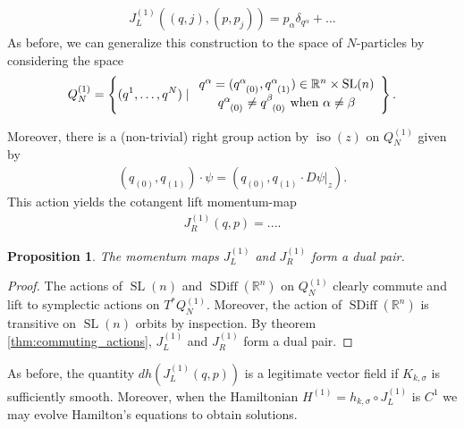 \documentclass[12pt]{amsart}
\newcommand{\R}{\ensuremath{\mathbb{R}}}
\newtheorem{prop}[thm]{Proposition}
\DeclareMathOperator{\SDiff}{SDiff}
\DeclareMathOperator{\SL}{SL}
\DeclareMathOperator{\iso}{iso}
\begin{document}
  \begin{align*}
    J_L^{(1)}( (q, j ),(p, p_j) ) = p_\alpha \delta_{q^{\alpha}} + \dots
  \end{align*}
  As before, we can generalize this construction to the space of
  $N$-particles by considering the space
  \begin{align*}
    Q^{(1)}_N = \left\{  ( q^1 , \dots, q^N ) \mid 
      \begin{array}{c}
        q^\alpha = (q\indices{^\alpha_{(0)} } ,q\indices{^\alpha_{(1)} } ) \in \R^n \times \SL(n) \\
        q\indices{^\alpha_{(0)}} \neq q\indices{^\beta_{(0)}} \text{ when } \alpha \neq \beta
      \end{array} \right\}. 
  \end{align*}

  Moreover, there is a (non-trivial) right group action by $\iso(z)$ on $Q^{(1)}_N$ given by
  \begin{align*}
    (q_{(0)} , q_{(1)} ) \cdot \psi = (q_{(0)} , q_{(1)} \cdot D\psi|_z).
  \end{align*}
  This action yields the cotangent lift momentum-map
  \begin{align*}
    J_R^{(1)}( q,p) = ....
  \end{align*}
  \begin{prop}
    The momentum maps $J_L^{(1)}$ and $J_R^{(1)}$ form a dual pair.
  \end{prop}
  \begin{proof}
    The actions of $\SL(n)$ and $\SDiff(\R^n)$ on $Q_N^{(1)}$ clearly commute
    and lift to symplectic actions on $T^*Q_N^{(1)}$.
    Moreover, the action of $\SDiff(\R^n)$ is transitive on $\SL(n)$ orbits
    by inspection.
    By theorem \ref{thm:commuting_actions}, $J_L^{(1)}$ and $J_R^{(1)}$ form a dual pair.
  \end{proof}

  As before, the quantity $dh( J_L^{(1)}(q,p))$ is a legitimate vector field
  if $K_{k,\sigma}$ is sufficiently smooth.  Moreover, when the Hamiltonian
  $H^{(1)} = h_{k,\sigma} \circ J_L^{(1)}$ is $C^1$ we may evolve Hamilton's equations
  to obtain solutions.
  
\end{document}
